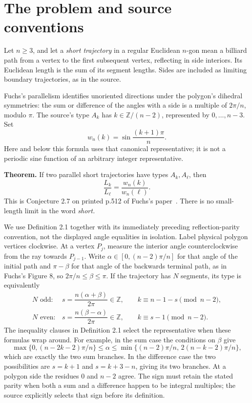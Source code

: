 \documentclass[11pt]{article}
\begin{document}
\section{The problem and source conventions}

Let \(n\ge3\), and let a \emph{short trajectory} in a regular Euclidean \(n\)-gon mean a billiard path from a vertex to the first subsequent vertex, reflecting in side interiors. Its Euclidean length is the sum of its segment lengths. Sides are included as limiting boundary trajectories, as in the source.

Fuchs's parallelism identifies unoriented directions under the polygon's dihedral symmetries: the sum or difference of the angles with a side is a multiple of \(2\pi/n\), modulo \(\pi\). The source's type \(A_k\) has \(k\in\mathbb Z/(n-2)\), represented by \(0,\ldots,n-3\). Set
\[
w_n(k)=\sin\frac{(k+1)\pi}{n}.
\]
Here and below this formula uses that canonical representative; it is not a periodic sine function of an arbitrary integer representative.

\textbf{Theorem.} If two parallel short trajectories have types \(A_k,A_\ell\), then
\[
\frac{L_k}{L_\ell}=\frac{w_n(k)}{w_n(\ell)}.
\tag{1}
\]
This is Conjecture 2.7 on printed p.512 of Fuchs's paper~\cite{Fuchs}. There is no small-length limit in the word \emph{short.}

We use Definition 2.1 together with its immediately preceding reflection-parity convention, not the displayed angle equalities in isolation. Label physical polygon vertices clockwise. At a vertex \(P_j\), measure the interior angle counterclockwise from the ray towards \(P_{j-1}\). Write \(\alpha\in[0,(n-2)\pi/n]\) for that angle of the initial path and \(\pi-\beta\) for that angle of the backwards terminal path, as in Fuchs's Figure 8, so \(2\pi/n\le\beta\le\pi\). If the trajectory has \(N\) segments, its type is equivalently
\[
\begin{array}{ll}
N\text{ odd}:&
s=\dfrac{n(\alpha+\beta)}{2\pi}\in\mathbb Z,\qquad k\equiv n-1-s\pmod{n-2},\\[4pt]
N\text{ even}:&
s=\dfrac{n(\beta-\alpha)}{2\pi}\in\mathbb Z,\qquad k\equiv s-1\pmod{n-2}.
\end{array}
\tag{2}
\]
The inequality clauses in Definition 2.1 select the representative when these formulas wrap around. For example, in the sum case the conditions on \(\beta\) give
\[
\max\{0,(n-2k-2)\pi/n\}\le\alpha
\le\min\{(n-2)\pi/n,\,2(n-k-2)\pi/n\},
\]
which are exactly the two sum branches. In the difference case the two possibilities are \(s=k+1\) and \(s=k+3-n\), giving its two branches. At a polygon side the residues \(0\) and \(n-2\) agree. The sign must retain the stated parity when both a sum and a difference happen to be integral multiples; the source explicitly selects that sign before its definition.
\end{document}
